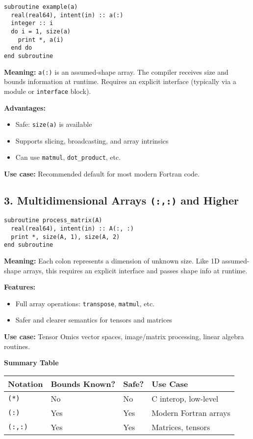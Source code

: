 \documentclass{article}
\begin{document}
\begin{verbatim}
subroutine example(a)
  real(real64), intent(in) :: a(:)
  integer :: i
  do i = 1, size(a)
    print *, a(i)
  end do
end subroutine
\end{verbatim}

\textbf{Meaning:} \texttt{a(:)} is an assumed-shape array. The compiler receives size and bounds information at runtime. Requires an explicit interface (typically via a module or \texttt{interface} block).

\textbf{Advantages:}
\begin{itemize}
  \item Safe: \texttt{size(a)} is available
  \item Supports slicing, broadcasting, and array intrinsics
  \item Can use \texttt{matmul}, \texttt{dot\_product}, etc.
\end{itemize}

\textbf{Use case:} Recommended default for most modern Fortran code.


\subsection{3. Multidimensional Arrays \texttt{(:,:)} and Higher}

\begin{verbatim}
subroutine process_matrix(A)
  real(real64), intent(in) :: A(:, :)
  print *, size(A, 1), size(A, 2)
end subroutine
\end{verbatim}

\textbf{Meaning:} Each colon represents a dimension of unknown size. Like 1D assumed-shape arrays, this requires an explicit interface and passes shape info at runtime.

\textbf{Features:}
\begin{itemize}
  \item Full array operations: \texttt{transpose}, \texttt{matmul}, etc.
  \item Safer and clearer semantics for tensors and matrices
\end{itemize}

\textbf{Use case:} Tensor Omics vector spaces, image/matrix processing, linear algebra routines.

\vspace{1em}

\noindent\textbf{Summary Table}

\begin{tabular}{|l|l|l|l|}
\hline
Notation & Bounds Known? & Safe? & Use Case \\
\hline
\texttt{(*)} & No  & No  & C interop, low-level \\
\texttt{(:)} & Yes & Yes & Modern Fortran arrays \\
\texttt{(:,:)} & Yes & Yes & Matrices, tensors \\
\hline
\end{tabular}
\end{document}
